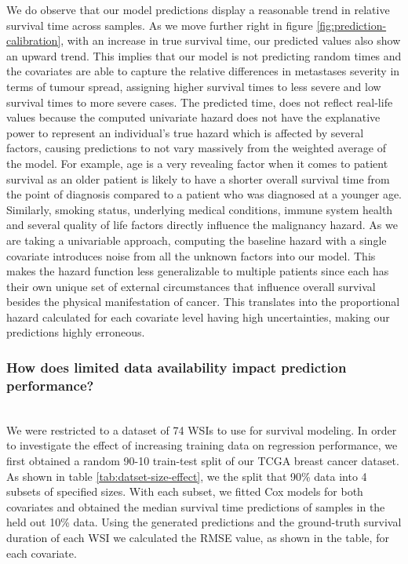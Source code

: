 \documentclass{l4proj}
\begin{document}
We do observe that our model predictions display a reasonable trend in relative survival time across samples. As we move further right in figure \ref{fig:prediction-calibration}, with an increase in true survival time, our predicted values also show an upward trend. This implies that our model is not predicting random times and the covariates are able to capture the relative differences in metastases severity in terms of tumour spread, assigning higher survival times to less severe and low survival times to more severe cases. The predicted time, does not reflect real-life values because the computed univariate hazard does not have the explanative power to represent an individual's true hazard which is affected by several factors, causing predictions to not vary massively from the weighted average of the model. For example, age is a very revealing factor when it comes to patient survival as an older patient is likely to have a shorter overall survival time from the point of diagnosis compared to a patient who was diagnosed at a younger age. Similarly, smoking status, underlying medical conditions, immune system health and several quality of life factors directly influence the malignancy hazard. As we are taking a univariable approach, computing the baseline hazard with a single covariate introduces noise from all the unknown factors into our model. This makes the hazard function less generalizable to multiple patients since each has their own unique set of external circumstances that influence overall survival besides the physical manifestation of cancer. This translates into the proportional hazard calculated for each covariate level having high uncertainties, making our predictions highly erroneous. 

\subsubsection{How does limited data availability impact prediction performance?}\hfill \\
We were restricted to a dataset of 74 WSIs to use for survival modeling. In order to investigate the effect of increasing training data on regression performance, we first obtained a random 90-10 train-test split of our TCGA breast cancer dataset. As shown in table \ref{tab:datset-size-effect}, we the split that 90\% data into 4 subsets of specified sizes. With each subset, we fitted Cox models for both covariates and obtained the median survival time predictions of samples in the held out 10\% data. Using the generated predictions and the ground-truth survival duration of each WSI we calculated the RMSE value, as shown in the table, for each covariate.
\end{document}
